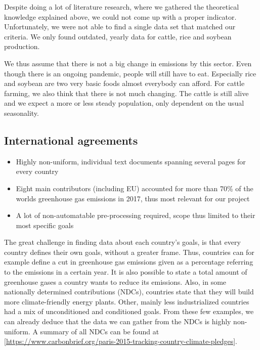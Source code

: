 Despite doing a lot of literature research, where we gathered the theoretical knowledge explained above, we could not come up with a proper indicator.
Unfortunately, we were not able to find a single data set that matched our criteria. We only found outdated, yearly data for cattle, rice and soybean production.

We thus assume that there is not a big change in \co emissions by this sector. Even though there is an ongoing pandemic, people will still have to eat. Especially rice and soybean are two very basic foods almost everybody can afford. For cattle farming, we also think that there is not much changing. The cattle is still alive and we expect a more or less steady population, only dependent on the usual seasonality.


\subsection*{International agreements}
\begin{itemize}
	\item Highly non-uniform, individual text documents spanning several pages for every country
	\item Eight main contributors (including EU) accounted for more than 70\% of the worlds greenhouse gas emissions in 2017, thus most relevant for our project
	\item A lot of non-automatable pre-processing  required, scope thus limited to their most specific goals
\end{itemize}

The great challenge in finding data about each country's goals, is that every country defines their own goals, without a greater frame. Thus, countries can for example define a cut in greenhouse gas emissions given as a percentage referring to the emissions in a certain year. It is also possible to state a total amount of greenhouse gases a country wants to reduce its emissions. Also, in some nationally determined contributions (NDCs), countries state that they will build more climate-friendly energy plants. Other, mainly less industrialized countries had a mix of unconditioned and conditioned goals. From these few examples, we can already deduce that the data we can gather from the NDCs is highly non-uniform. A summary of all NDCs can be found at [\url{https://www.carbonbrief.org/paris-2015-tracking-country-climate-pledges}].

